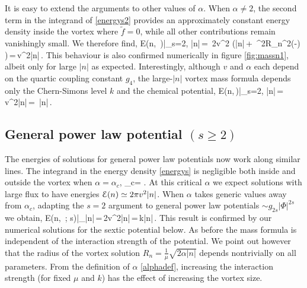 It is easy to extend the arguments to  other values of $\alpha$. When $\alpha\neq 2$, the second term in the integrand of \eqref{energys2} provides an approximately constant energy density inside the vortex where $\tilde f=0$, while all other contributions remain vanishingly small. We therefore find,
\be
{\cal E}(n, \,\alpha)\big|_{s=2, |n|}\,=\, 2\pi v^2 \left(|n|\,+\, \mu^2R_n^2\left(-\right) \right)\,=\,\alpha\pi v^2|n|\,.
\ee
This behaviour is also confirmed numerically in figure \ref{fig:massn1}, albeit only for large $|n|$ as expected. Interestingly, although $v$ and $\alpha$ each  depend on the quartic coupling constant $g_4$, the large-$|n|$ vortex mass formula depends only the Chern-Simons level $k$ and the chemical potential,
\be
{\cal E}(n,\,\alpha)\big|_{s=2, |n|}\,=\,\alpha\pi v^2|n|\,=\, |n|\,.
\ee

\subsection{General power law potential $(s\geq 2)$}
 The energies of solutions for general power law potentials now work along similar lines.  The integrand in the energy density \eqref{energys} is negligible both inside and outside the vortex when $\alpha=\alpha_c$,
 \be
 \alpha_c= .
 \ee 
 At this critical  $\alpha$ we expect solutions with large flux to have energies ${\cal E}(n)\simeq 2\pi v^2 |n|$. When $\alpha$ takes generic values away from  $\alpha_c$, adapting the $s=2$ argument to general power law potentials $\sim g_{2s}|\Phi|^{2s}$  we obtain,
 \be
 {\cal E}(n, \,\alpha; s)\big|_{|n|}\,=\,2\alpha\pi v^2|n|\,=\,k\mu|n|\,.\label{generalenergy}
 \ee
This result is confirmed by our numerical solutions for the sextic potential below. As before the mass formula is independent of the interaction strength of the potential. We point out however that the radius of the vortex solution $R_n=\frac{1}{\mu}\sqrt{2\alpha |n|}$ depends nontrivially on all parameters. From the definition of $\alpha$ \eqref{alphadef}, increasing the interaction strength (for fixed $\mu$ and $k$) has the effect of increasing the vortex size.
